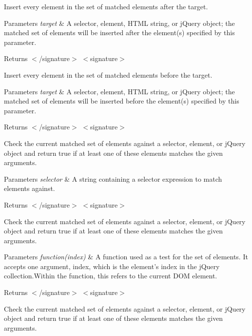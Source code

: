 Insert every element in the set of matched elements after the target.


\begin{DoxyParams}{Parameters}
{\em target} & A selector, element, H\-T\-M\-L string, or j\-Query object; the matched set of elements will be inserted after the element(s) specified by this parameter.\\
\hline
\end{DoxyParams}
\begin{DoxyReturn}{Returns}
$<$/signature$>$ $<$signature$>$ 

Insert every element in the set of matched elements before the target.
\end{DoxyReturn}

\begin{DoxyParams}{Parameters}
{\em target} & A selector, element, H\-T\-M\-L string, or j\-Query object; the matched set of elements will be inserted before the element(s) specified by this parameter.\\
\hline
\end{DoxyParams}
\begin{DoxyReturn}{Returns}
$<$/signature$>$ $<$signature$>$ 

Check the current matched set of elements against a selector, element, or j\-Query object and return true if at least one of these elements matches the given arguments.
\end{DoxyReturn}

\begin{DoxyParams}{Parameters}
{\em selector} & A string containing a selector expression to match elements against.\\
\hline
\end{DoxyParams}
\begin{DoxyReturn}{Returns}
$<$/signature$>$ $<$signature$>$ 

Check the current matched set of elements against a selector, element, or j\-Query object and return true if at least one of these elements matches the given arguments.
\end{DoxyReturn}

\begin{DoxyParams}{Parameters}
{\em function(index)} & A function used as a test for the set of elements. It accepts one argument, index, which is the element's index in the j\-Query collection.\-Within the function, this refers to the current D\-O\-M element.\\
\hline
\end{DoxyParams}
\begin{DoxyReturn}{Returns}
$<$/signature$>$ $<$signature$>$ 

Check the current matched set of elements against a selector, element, or j\-Query object and return true if at least one of these elements matches the given arguments.
\end{DoxyReturn}

